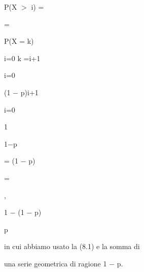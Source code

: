 \documentclass[a4paper,portrait,12pt]{article}
\begin{document}
\begin{flushleft}
P(X $>$ i) =
\end{flushleft}





=





\begin{flushleft}
P(X = k)
\end{flushleft}


\begin{flushleft}
i=0 k =i+1
\end{flushleft}





\begin{flushleft}
i=0
\end{flushleft}





\begin{flushleft}
(1 $-$ p)i+1
\end{flushleft}





\begin{flushleft}
i=0
\end{flushleft}





1


\begin{flushleft}
1$-$p
\end{flushleft}


\begin{flushleft}
= (1 $-$ p)
\end{flushleft}


=


,


\begin{flushleft}
1 $-$ (1 $-$ p)
\end{flushleft}


\begin{flushleft}
p
\end{flushleft}


\begin{flushleft}
 in cui abbiamo usato la (8.1) e la somma di
\end{flushleft}


\begin{flushleft}
una serie geometrica di ragione 1 $-$ p.
\end{flushleft}
\end{document}
